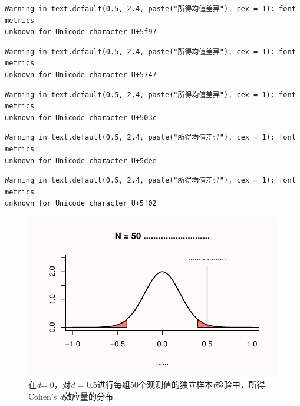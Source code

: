 \documentclass[
  letterpaper,
  DIV=11,
  numbers=noendperiod]{scrreprt}
\begin{document}
\begin{verbatim}
Warning in text.default(0.5, 2.4, paste("所得均值差异"), cex = 1): font metrics
unknown for Unicode character U+5f97
\end{verbatim}

\begin{verbatim}
Warning in text.default(0.5, 2.4, paste("所得均值差异"), cex = 1): font metrics
unknown for Unicode character U+5747
\end{verbatim}

\begin{verbatim}
Warning in text.default(0.5, 2.4, paste("所得均值差异"), cex = 1): font metrics
unknown for Unicode character U+503c
\end{verbatim}

\begin{verbatim}
Warning in text.default(0.5, 2.4, paste("所得均值差异"), cex = 1): font metrics
unknown for Unicode character U+5dee
\end{verbatim}

\begin{verbatim}
Warning in text.default(0.5, 2.4, paste("所得均值差异"), cex = 1): font metrics
unknown for Unicode character U+5f02
\end{verbatim}

\begin{figure}

{\centering \includegraphics[width=1\textwidth,height=\textheight]{01-pvalue_files/figure-pdf/fig-fig137-1.pdf}

}

\caption{\label{fig-fig137}在\emph{d}= 0，对\emph{d} =
0.5进行每组50个观测值的独立样本\emph{t}检验中，所得Cohen's
\emph{d}效应量的分布}

\end{figure}
\end{document}
